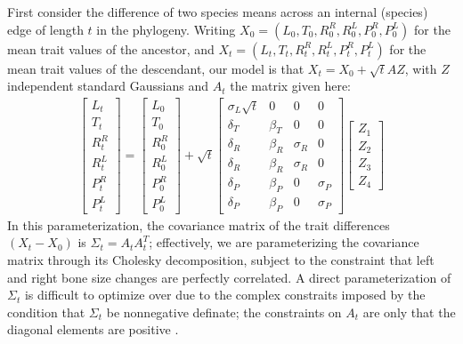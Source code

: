 \documentclass{article}
\begin{document}
First consider the difference of two species means across an internal (species) edge of length $t$ in the phylogeny.
Writing $X_0=(L_0,T_0,R^R_0,R^L_0,P^R_0,P^L_0)$ for the mean trait values of the ancestor,
and $X_t=(L_t,T_t,R^R_t,R^L_t,P^R_t,P^L_t)$ for the mean trait values of the descendant,
our model is that $X_t = X_0 + \sqrt{t} A Z$, with $Z$ independent standard Gaussians and $A_t$ the matrix given here:
\begin{align} \label{eqn:species_matrix}
\begin{bmatrix}
    L_t \\ T_t \\ R^R_t \\ R^L_t \\ P^R_t \\ P^L_t 
\end{bmatrix}
=
\begin{bmatrix}
    L_0 \\ T_0 \\ R^R_0 \\ R^L_0 \\ P^R_0 \\ P^L_0 
\end{bmatrix}
+
\sqrt{t}
\begin{bmatrix}
    \sigma_L \sqrt{t} &  0  & 0  & 0  \\
    \delta_T   &  \beta_T   & 0  &   0 \\
    \delta_R   &  \beta_R   & \sigma_R   &   0 \\
    \delta_R   &  \beta_R   & \sigma_R   &   0 \\
    \delta_P   &  \beta_P   & 0  &   \sigma_P  \\
    \delta_P   &  \beta_P   & 0  &   \sigma_P  
\end{bmatrix}
\begin{bmatrix}
    Z_1 \\ Z_2 \\ Z_3 \\ Z_4
\end{bmatrix}
\end{align}
In this parameterization, the covariance matrix of the trait differences $(X_t - X_0)$ is $\Sigma_t = A_t A_t^T$;
effectively, we are parameterizing the covariance matrix through its Cholesky decomposition,
subject to the constraint that left and right bone size changes are perfectly correlated.
A direct parameterization of $\Sigma_t$ is difficult to optimize over due to the complex constraits imposed by
the condition that $\Sigma_t$ be nonnegative definate;
the constraints on $A_t$ are only that the diagonal elements are positive \citep{pourahmadi1999joint}.
\end{document}
